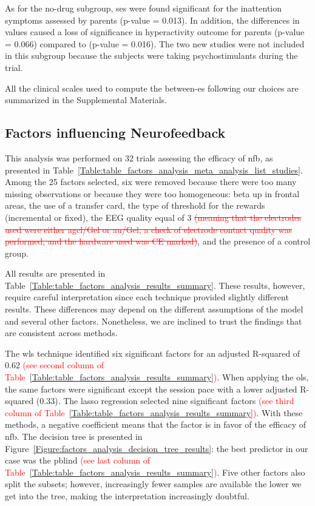 As for the no-drug subgroup, \glspl{se} were found significant for the inattention symptoms assessed by parents (p-value = 0.013). 
In addition, the differences in \citet{Arnold2014} values caused a loss of significance in hyperactivity outcome for parents 
(p-value = 0.066) compared to \citet{Cortese2016} (p-value = 0.016). The two new studies were not included in this 
subgroup because the subjects were taking psychostimulants during the trial.

All the clinical scales used to compute the between-\gls{es} following our choices are summarized in the Supplemental Materials.

\subsection{Factors influencing Neurofeedback}

This analysis was performed on 32 trials assessing the efficacy of \gls{nfb}, as presented 
in Table~\ref{Table:table_factors_analysis_meta_analysis_list_studies}. Among the 25 factors selected, six were 
removed because there were too many missing observations or because they were too homogeneous: beta up in frontal areas, 
the use of a transfer card, the type of threshold for the rewards (incremental or fixed), the EEG quality equal of 3
\textcolor{red}{\sout{(meaning that the electrodes used were either \gls{agcl}/Gel or \gls{au}/Gel, a check of electrode contact quality was
performed, and the hardware used was CE marked)}}, and the presence of a control group. 

All results are presented in Table~\ref{Table:table_factors_analysis_results_summary}. These results, however, require 
careful interpretation since each technique provided slightly different results. These differences 
may depend on the different assumptions of the model and several other factors. Nonetheless, we are inclined to 
trust the findings that are consistent across methods. 

The \gls{wls} technique identified six significant factors for an adjusted R-squared of 0.62 \textcolor{red}{(see second column of 
Table~\ref{Table:table_factors_analysis_results_summary})}. 
When applying the \gls{ols}, the same factors were significant except the session pace with a lower adjusted R-squared 
(0.33). The \gls{lasso} regression selected nine significant factors \textcolor{red}{(see third column of 
Table~\ref{Table:table_factors_analysis_results_summary})}. With these methods, a negative coefficient means 
that the factor is in favor of the efficacy of \gls{nfb}. The decision tree is presented in Figure~\ref{Figure:factors_analysis_decision_tree_results}: 
the best predictor in our case was the \gls{pblind} \textcolor{red}{(see last column of 
Table~\ref{Table:table_factors_analysis_results_summary})}. Five other factors also split the subsets; however, 
increasingly fewer samples are available the lower we get into the tree, making the interpretation increasingly doubtful.  

